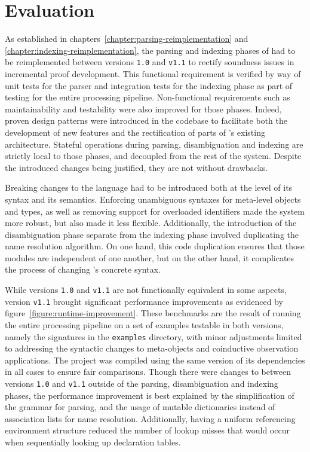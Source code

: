 \section{Evaluation}

As established in chapters~\ref{chapter:parsing-reimplementation} and \ref{chapter:indexing-reimplementation}, the parsing and indexing phases of \Beluga had to be reimplemented between versions \texttt{1.0} and \texttt{v1.1} to rectify soundness issues in incremental proof development.
This functional requirement is verified by way of unit tests for the parser and integration tests for the indexing phase as part of testing for the entire processing pipeline.
Non-functional requirements such as maintainability and testability were also improved for those phases.
Indeed, proven design patterns were introduced in the codebase to facilitate both the development of new features and the rectification of parts of \Beluga's existing architecture.
Stateful operations during parsing, disambiguation and indexing are strictly local to those phases, and decoupled from the rest of the system.
Despite the introduced changes being justified, they are not without drawbacks.

Breaking changes to the \Beluga language had to be introduced both at the level of its syntax and its semantics.
Enforcing unambiguous syntaxes for meta-level objects and types, as well as removing support for overloaded identifiers made the system more robust, but also made it less flexible.
Additionally, the introduction of the disambiguation phase separate from the indexing phase involved duplicating the name resolution algorithm.
On one hand, this code duplication ensures that those modules are independent of one another, but on the other hand, it complicates the process of changing \Beluga's concrete syntax.

While \Beluga versions \texttt{1.0} and \texttt{v1.1} are not functionally equivalent in some aspects, version \texttt{v1.1} brought significant performance improvements as evidenced by figure~\ref{figure:runtime-improvement}.
These benchmarks are the result of running the entire processing pipeline on a set of examples testable in both versions, namely the \Beluga signatures in the \texttt{examples} directory, with minor adjustments limited to addressing the syntactic changes to meta-objects and coinductive observation applications.
The project was compiled using the same version of its dependencies in all cases to ensure fair comparisons.
Though there were changes to \Beluga between versions \texttt{1.0} and \texttt{v1.1} outside of the parsing, disambiguation and indexing phases, the performance improvement is best explained by the simplification of the grammar for parsing, and the usage of mutable dictionaries instead of association lists for name resolution.
Additionally, having a uniform referencing environment structure reduced the number of lookup misses that would occur when sequentially looking up declaration tables.

